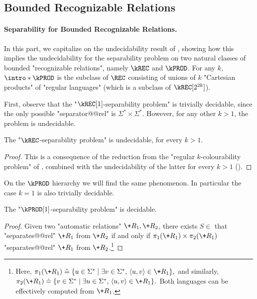 \subsection{Bounded Recognizable Relations}
\label{sec:dichotomy-bounded}

\paragraph*{Separability for Bounded Recognizable Relations.}

In this part, we capitalize on the undecidability result of , showing how this implies the undecidability for the separability problem on two natural classes of bounded "recognizable relations", namely $\kREC$ and $\kPROD$.
For any $k$, \AP$\intro*\kPROD$ is the subclass of $\REC$ consisting of unions of $k$ "Cartesian products" of "regular languages" (which is a subclass of $\kREC[2^{2k}]$).

First, observe that the "$\kREC[1]$-separability problem" is trivially decidable, since the only possible "separator@@rel" is $\Sigma^* \times \Sigma^*$. However, for any other $k>1$, the problem is undecidable.

\begin{corollary}
    \label{coro:krec-sep-undec}
    The "$\kREC$-separability problem" is undecidable, for every $k>1$.
\end{corollary}

\begin{proof}
    This is a consequence of the reduction from the "regular $k$-colourability problem" of , combined with the undecidability of the latter for every $k>1$ ().
\end{proof}

On the $\kPROD$ hierarchy we will find the same phenomenon. In particular the case $k=1$ is also trivially decidable.

\begin{proposition}
    The "$\kPROD[1]$-separability problem" is decidable.
\end{proposition}
\begin{proof}
    Given two "automatic relations" $\+R_1, \+R_2$, there exists $S \in $ \kPROD[1]
    that "separates@@rel" $\+R_1$ from $\+R_2$ if and only if $\pi_1(\+R_1)\times \pi_2(\+R_1)$
    "separates@@rel" $\+R_1$ from $\+R_2$.\footnote{Here,
    \(
        \pi_1(\+R_1) \defeq 
        \{u \in \Sigma^* \mid \exists v\in \Sigma^*,\,\tup{u,v} \in \+R_1\},
    \)
    and similarly,
    \(
        \pi_2(\+R_1) \defeq 
        \{v \in \Sigma^* \mid \exists u\in \Sigma^*,\,\tup{u,v} \in \+R_1\}.
    \)
    Both languages can be effectively computed from $\+R_1$.}
\end{proof}

